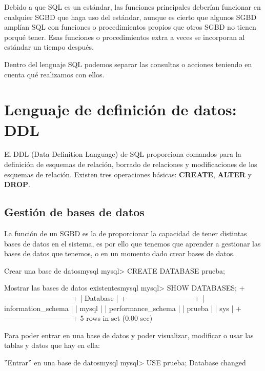 Debido a que SQL es un estándar, las funciones principales deberían funcionar en cualquier SGBD que haga uso del estándar, aunque es cierto que algunos SGBD amplían SQL con funciones o procedimientos propios que otros SGBD no tienen porqué tener. Esas funciones o procedimientos extra a veces se incorporan al estándar un tiempo después.

Dentro del lenguaje SQL podemos separar las consultas o acciones teniendo en cuenta qué realizamos con ellos.


\section{Lenguaje de definición de datos: DDL}
El DDL (Data Definition Language) de SQL proporciona comandos para la definición de esquemas de relación, borrado de relaciones y modificaciones de los esquemas de relación. Existen tres operaciones básicas: \textbf{CREATE}, \textbf{ALTER} y \textbf{DROP}.

\subsection{Gestión de bases de datos}
La función de un SGBD es la de proporcionar la capacidad de tener distintas bases de datos en el sistema, es por ello que tenemos que aprender a gestionar las bases de datos que tenemos, o en un momento dado crear bases de datos.


\begin{mycode}{Crear una base de datos}{mysql}{}
mysql> CREATE DATABASE prueba;
\end{mycode}




\begin{mycode}{Mostrar las bases de datos existentes}{mysql}{}
mysql> SHOW DATABASES;
+-----------------------------+
| Database                    |
+-----------------------------+
| information_schema          |
| mysql                       |
| performance_schema          |
| prueba                      |
| sys                         |
+-----------------------------+
5 rows in set (0.00 sec)
\end{mycode}


Para poder entrar en una base de datos y poder visualizar, modificar o usar las tablas y datos que hay en ella:

\begin{mycode}{”Entrar” en una base de datos}{mysql}{}
mysql> USE prueba;
Database changed
\end{mycode}

